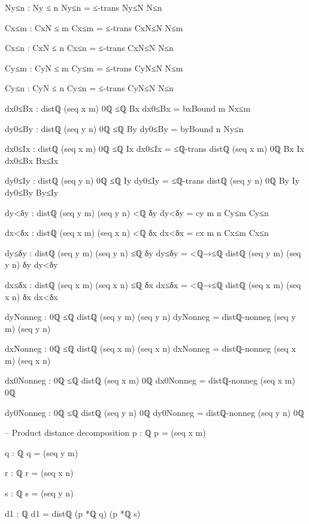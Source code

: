 \documentclass[11pt,a4paper]{book}
\begin{document}
\begin{code}
{          Ny≤n : Ny ≤ n
          Ny≤n = ≤-trans Ny≤N N≤n

          Cx≤m : CxN ≤ m
          Cx≤m = ≤-trans CxN≤N N≤m

          Cx≤n : CxN ≤ n
          Cx≤n = ≤-trans CxN≤N N≤n

          Cy≤m : CyN ≤ m
          Cy≤m = ≤-trans CyN≤N N≤m

          Cy≤n : CyN ≤ n
          Cy≤n = ≤-trans CyN≤N N≤n

          dx0≤Bx : distℚ (seq x m) 0ℚ ≤ℚ Bx
          dx0≤Bx = bxBound m Nx≤m

          dy0≤By : distℚ (seq y n) 0ℚ ≤ℚ By
          dy0≤By = byBound n Ny≤n

          dx0≤Ix : distℚ (seq x m) 0ℚ ≤ℚ Ix
          dx0≤Ix = ≤ℚ-trans {distℚ (seq x m) 0ℚ} {Bx} {Ix} dx0≤Bx Bx≤Ix

          dy0≤Iy : distℚ (seq y n) 0ℚ ≤ℚ Iy
          dy0≤Iy = ≤ℚ-trans {distℚ (seq y n) 0ℚ} {By} {Iy} dy0≤By By≤Iy

          dy<δy : distℚ (seq y m) (seq y n) <ℚ δy
          dy<δy = cy m n Cy≤m Cy≤n

          dx<δx : distℚ (seq x m) (seq x n) <ℚ δx
          dx<δx = cx m n Cx≤m Cx≤n

          dy≤δy : distℚ (seq y m) (seq y n) ≤ℚ δy
          dy≤δy = <ℚ→≤ℚ {distℚ (seq y m) (seq y n)} {δy} dy<δy

          dx≤δx : distℚ (seq x m) (seq x n) ≤ℚ δx
          dx≤δx = <ℚ→≤ℚ {distℚ (seq x m) (seq x n)} {δx} dx<δx

          dyNonneg : 0ℚ ≤ℚ distℚ (seq y m) (seq y n)
          dyNonneg = distℚ-nonneg (seq y m) (seq y n)

          dxNonneg : 0ℚ ≤ℚ distℚ (seq x m) (seq x n)
          dxNonneg = distℚ-nonneg (seq x m) (seq x n)

          dx0Nonneg : 0ℚ ≤ℚ distℚ (seq x m) 0ℚ
          dx0Nonneg = distℚ-nonneg (seq x m) 0ℚ

          dy0Nonneg : 0ℚ ≤ℚ distℚ (seq y n) 0ℚ
          dy0Nonneg = distℚ-nonneg (seq y n) 0ℚ

          -- Product distance decomposition
          p : ℚ
          p = (seq x m)

          q : ℚ
          q = (seq y m)

          r : ℚ
          r = (seq x n)

          s : ℚ
          s = (seq y n)

          d1 : ℚ
          d1 = distℚ (p *ℚ q) (p *ℚ s)

}
\end{code}
\end{document}
